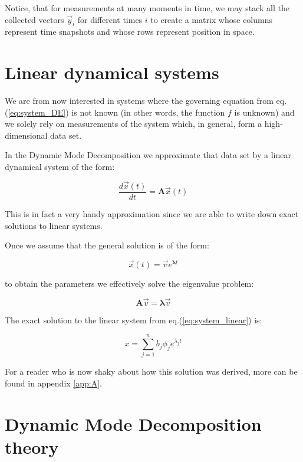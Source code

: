 \documentclass[10pt,twocolumn]{article}
\begin{document}
Notice, that for measurements at many moments in time, we may stack all the collected vectors $\vec{y}_i$ for different times $i$ to create a matrix whose columns represent time snapshots and whose rows represent position in space.

\section{Linear dynamical systems}

We are from now interested in systems where the governing equation from eq.(\ref{eq:system_DE}) is not known (in other words, the function $f$ is unknown) and we solely rely on measurements of the system which, in general, form a high-dimensional data set.

In the Dynamic Mode Decomposition we approximate that data set by a linear dynamical system of the form:

\begin{equation} \label{eq:system_linear}
\frac{d \vec{x}(t)}{dt} = \bm{A} \vec{x}(t)
\end{equation}

This is in fact a very handy approximation since we are able to write down exact solutions to linear systems.

Once we assume that the general solution is of the form:

\begin{equation} \label{eq:general_solution}
\vec{x}(t) = \vec{v} e^{\bm{\lambda} t}
\end{equation}

to obtain the parameters we effectively solve the eigenvalue problem:

\begin{equation} \label{eq:eigenvalue_solution}
\bm{A} \vec{v} = \bm{\lambda} \vec{v}
\end{equation}

The exact solution to the linear system from eq.(\ref{eq:system_linear}) is:

\begin{equation} \label{eq:soln_exact}
x = \sum_{j = 1}^{n} b_j \phi_j e^{\lambda_j t}
\end{equation}

For a reader who is now shaky about how this solution was derived, more can be found in appendix \ref{app:A}. 

\section{Dynamic Mode Decomposition theory}
\end{document}
